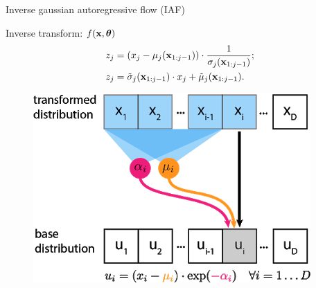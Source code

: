 \begin{frame}{Inverse gaussian autoregressive flow (IAF)}
	\begin{minipage}[t]{0.65\columnwidth}
		\begin{block}{Inverse transform: $f(\mathbf{x}, \boldsymbol{\theta})$}
			\vspace{-0.5cm}
			\begin{align*}
				z_j &= (x_j - \mu_j(\mathbf{x}_{1:j-1})) \cdot \frac{1}{\sigma_j (\mathbf{x}_{1:j-1}) }; \\
				z_j &= \tilde{\sigma}_j (\mathbf{x}_{1:j-1}) \cdot x_j + \tilde{\mu}_j(\mathbf{x}_{1:j-1}).
			\end{align*}
			\vspace{-0.4cm}
		\end{block}
	\end{minipage}%
	\begin{minipage}[t]{0.35\columnwidth}
		\begin{figure}[h]
			\centering
			\includegraphics[width=.9\linewidth]{figs/af_iaf_explained_2.png}
		\end{figure}
	\end{minipage}\\
	\vspace{0.1cm}
	

\end{frame}
